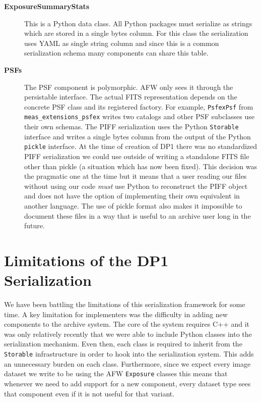 \begin{description}
\item[\textbf{ExposureSummaryStats}]

This is a Python data class.
All Python packages must serialize as strings which are stored in a single bytes column.
For this class the serialization uses YAML as single string column and since this is a common serialization schema many components can share this table.

\item[\textbf{PSFs}]

The PSF component is polymorphic.
AFW only sees it through the persistable interface.
The actual FITS representation depends on the concrete PSF class and its registered factory.
For example, \texttt{PsfexPsf} from \texttt{meas\_extensions\_psfex} writes two catalogs and other PSF subclasses use their own schemas.
The PIFF serialization uses the Python \texttt{Storable} interface and writes a single bytes column from the output of the Python \texttt{pickle} interface.
At the time of creation of DP1 there was no standardized PIFF serialization we could use outside of writing a standalone FITS file other than pickle (a situation which has now been fixed).
This decision was the pragmatic one at the time but it means that a user reading our files without using our code \emph{must} use Python to reconstruct the PIFF object and does not have the option of implementing their own equivalent in another language.
The use of pickle format also makes it impossible to document these files in a way that is useful to an archive user long in the future.

\end{description}

\section{Limitations of the DP1 Serialization}

We have been battling the limitations of this serialization framework for some time.\cite{DMTN-120,DMTN-251}
A key limitation for implementers was the difficulty in adding new components to the archive system.
The core of the system requires C++ and it was only relatively recently that we were able to include Python classes into the serialization mechanism.
Even then, each class is required to inherit from the \texttt{Storable} infrastructure in order to hook into the serialization system.
This adds an unnecessary burden on each class.
Furthermore, since we expect every image dataset we write to be using the AFW \texttt{Exposure} classes this means that whenever we need to add support for a new component, every dataset type sees that component even if it is not useful for that variant.

